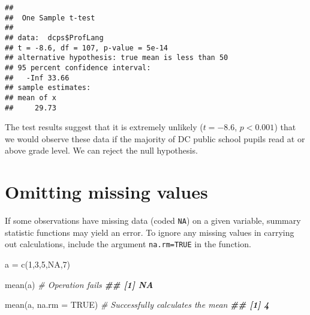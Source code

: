 \documentclass[
  12pt,
]{krantz}
\newenvironment{Shaded}{\begin{snugshade}}{\end{snugshade}}
\newcommand{\AttributeTok}[1]{\textcolor[rgb]{0.77,0.63,0.00}{#1}}
\newcommand{\CommentTok}[1]{\textcolor[rgb]{0.56,0.35,0.01}{\textit{#1}}}
\newcommand{\ConstantTok}[1]{\textcolor[rgb]{0.00,0.00,0.00}{#1}}
\newcommand{\DecValTok}[1]{\textcolor[rgb]{0.00,0.00,0.81}{#1}}
\newcommand{\DocumentationTok}[1]{\textcolor[rgb]{0.56,0.35,0.01}{\textbf{\textit{#1}}}}
\newcommand{\FunctionTok}[1]{\textcolor[rgb]{0.00,0.00,0.00}{#1}}
\newcommand{\NormalTok}[1]{#1}
\newcommand{\OtherTok}[1]{\textcolor[rgb]{0.56,0.35,0.01}{#1}}
\newcommand{\SpecialCharTok}[1]{\textcolor[rgb]{0.00,0.00,0.00}{#1}}
\newcommand{\StringTok}[1]{\textcolor[rgb]{0.31,0.60,0.02}{#1}}
\begin{document}
\begin{Shaded}
\end{Shaded}

\begin{verbatim}
## 
##  One Sample t-test
## 
## data:  dcps$ProfLang
## t = -8.6, df = 107, p-value = 5e-14
## alternative hypothesis: true mean is less than 50
## 95 percent confidence interval:
##   -Inf 33.66
## sample estimates:
## mean of x 
##     29.73
\end{verbatim}

The test results suggest that it is extremely unlikely (\(t=-8.6\), \(p<0.001\)) that we would observe these data if the majority of DC public school pupils read at or above grade level. We can reject the null hypothesis.

\hypertarget{omitting-missing-values}{%
\section{Omitting missing values}\label{omitting-missing-values}}

If some observations have missing data (coded \texttt{NA}) on a given variable, summary statistic functions may yield an error. To ignore any missing values in carrying out calculations, include the argument \texttt{na.rm=TRUE} in the function.

\begin{Shaded}
\begin{Highlighting}[]

\NormalTok{  a }\OtherTok{=} \FunctionTok{c}\NormalTok{(}\DecValTok{1}\NormalTok{,}\DecValTok{3}\NormalTok{,}\DecValTok{5}\NormalTok{,}\ConstantTok{NA}\NormalTok{,}\DecValTok{7}\NormalTok{)}

  \FunctionTok{mean}\NormalTok{(a) }\CommentTok{\# Operation fails}
\DocumentationTok{\#\# [1] NA}
  
  \FunctionTok{mean}\NormalTok{(a, }\AttributeTok{na.rm =} \ConstantTok{TRUE}\NormalTok{) }\CommentTok{\# Successfully calculates the mean}
\DocumentationTok{\#\# [1] 4}
\end{Highlighting}
\end{Shaded}
\end{document}
